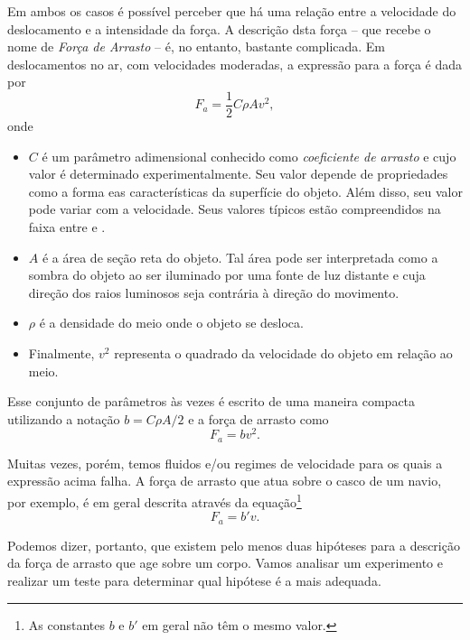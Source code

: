 Em ambos os casos é possível perceber que há uma relação entre a velocidade do deslocamento e a intensidade da força. A descrição dsta força -- que recebe o nome de \emph{Força de Arrasto} -- é, no entanto, bastante complicada. Em deslocamentos no ar, com velocidades moderadas, a expressão para a força é dada por
\begin{equation}
	F_a = \frac{1}{2} C\rho A v^2,
\end{equation}
%
onde
\begin{itemize}
	\item $C$ é um parâmetro adimensional conhecido como \emph{coeficiente de arrasto} e cujo valor é determinado experimentalmente. Seu valor depende de propriedades como a forma eas características da superfície do objeto. Além disso, seu valor pode variar com a velocidade. Seus valores típicos estão compreendidos na faixa entre  e .
	\item $A$ é a área de seção reta do objeto. Tal área pode ser interpretada como a sombra do objeto ao ser iluminado por uma fonte de luz distante e cuja direção dos raios luminosos seja contrária à direção do movimento.
	\item $\rho$ é a densidade do meio onde o objeto se desloca.
	\item Finalmente, $v^2$ representa o quadrado da velocidade do objeto em relação ao meio.
\end{itemize}

\pagebreak

Esse conjunto de parâmetros às vezes é escrito de uma maneira compacta utilizando a notação $b=C\rho A /2$ e a força de arrasto como
\begin{equation}
	F_a = bv^2.
\end{equation}

Muitas vezes, porém, temos fluidos e/ou regimes de velocidade para os quais a expressão acima falha. A força de arrasto que atua sobre o casco de um navio, por exemplo, é em geral descrita através da equação\footnote{As constantes $b$ e $b'$ em geral não têm o mesmo valor.}
\begin{equation}
	F_a = b'v.
\end{equation}

Podemos dizer, portanto, que existem pelo menos duas hipóteses para a descrição da força de arrasto que age sobre um corpo. Vamos analisar um experimento e realizar um teste para determinar qual hipótese é a mais adequada.

